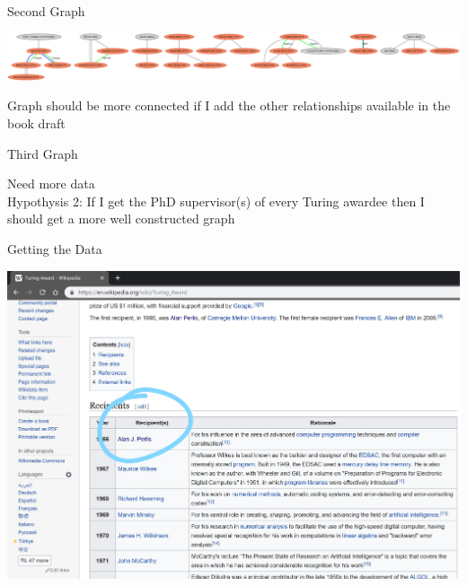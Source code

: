 \documentclass[11pt,aspectratio=169]{beamer}
\begin{document}
\begin{frame}{Second Graph}
    \begin{center}
        \includegraphics[scale = 0.12]{dotrel3.png}
        \pause
    \end{center}
    \begin{center}
        \vspace{1.0cm}
        Graph should be more connected if I add the other relationships available in the book draft
    \end{center}
\end{frame}

\begin{frame}{Third Graph}

    \begin{center}
        Need more data\\ \pause
        \vspace{1.0cm}
        Hypothysis 2: If I get the PhD supervisor(s) of every Turing awardee then I should get a more well constructed graph
    \end{center}

\end{frame}

\begin{frame}{Getting the Data}
    \pause
    \begin{center}
        \includegraphics[scale=0.13]{wiki.jpg}
    \end{center}
\end{frame}
\end{document}
